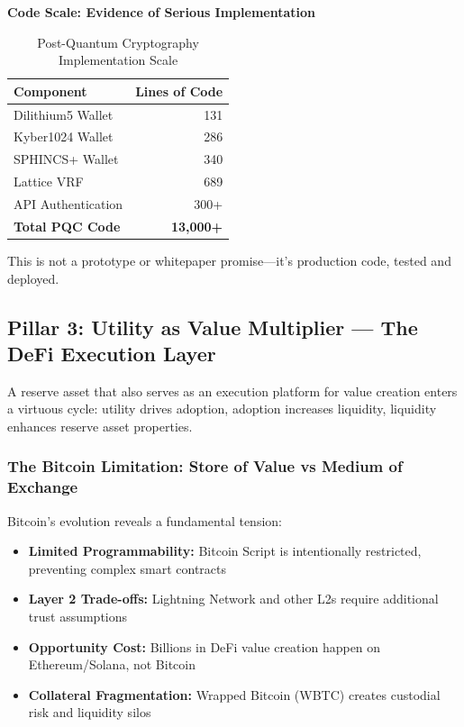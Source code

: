 \documentclass[11pt,a4paper]{article}
\begin{document}
\textbf{Code Scale: Evidence of Serious Implementation}

\begin{table}[h]
\centering
\begin{tabular}{@{}lr@{}}
\toprule
\textbf{Component} & \textbf{Lines of Code} \\ \midrule
Dilithium5 Wallet & 131 \\
Kyber1024 Wallet & 286 \\
SPHINCS+ Wallet & 340 \\
Lattice VRF & 689 \\
API Authentication & 300+ \\
\textbf{Total PQC Code} & \textbf{13,000+} \\ \bottomrule
\end{tabular}
\caption{Post-Quantum Cryptography Implementation Scale}
\end{table}

This is not a prototype or whitepaper promise—it's production code, tested and deployed.

\subsection{Pillar 3: Utility as Value Multiplier — The DeFi Execution Layer}

A reserve asset that also serves as an execution platform for value creation enters a virtuous cycle: utility drives adoption, adoption increases liquidity, liquidity enhances reserve asset properties.

\subsubsection{The Bitcoin Limitation: Store of Value vs Medium of Exchange}

Bitcoin's evolution reveals a fundamental tension:
\begin{itemize}[leftmargin=*]
\item \textbf{Limited Programmability:} Bitcoin Script is intentionally restricted, preventing complex smart contracts
\item \textbf{Layer 2 Trade-offs:} Lightning Network and other L2s require additional trust assumptions
\item \textbf{Opportunity Cost:} Billions in DeFi value creation happen on Ethereum/Solana, not Bitcoin
\item \textbf{Collateral Fragmentation:} Wrapped Bitcoin (WBTC) creates custodial risk and liquidity silos
\end{itemize}
\end{document}
